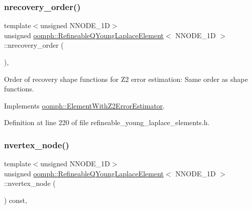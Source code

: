 \subsubsection{\texorpdfstring{nrecovery\+\_\+order()}{nrecovery\_order()}}
{\footnotesize\ttfamily template$<$unsigned N\+N\+O\+D\+E\+\_\+1D$>$ \\
unsigned \hyperlink{classoomph_1_1RefineableQYoungLaplaceElement}{oomph\+::\+Refineable\+Q\+Young\+Laplace\+Element}$<$ N\+N\+O\+D\+E\+\_\+1D $>$\+::nrecovery\+\_\+order (\begin{DoxyParamCaption}{ }\end{DoxyParamCaption})\hspace{0.3cm}{\ttfamily [inline]}, {\ttfamily [virtual]}}



Order of recovery shape functions for Z2 error estimation\+: Same order as shape functions. 



Implements \hyperlink{classoomph_1_1ElementWithZ2ErrorEstimator_af39480835bd3e0f6b2f4f7a9a4044798}{oomph\+::\+Element\+With\+Z2\+Error\+Estimator}.



Definition at line 220 of file refineable\+\_\+young\+\_\+laplace\+\_\+elements.\+h.

\mbox{\label{classoomph_1_1RefineableQYoungLaplaceElement_a529edc16e5232c8f1387f8858f8f20ad}} 
\subsubsection{\texorpdfstring{nvertex\+\_\+node()}{nvertex\_node()}}
{\footnotesize\ttfamily template$<$unsigned N\+N\+O\+D\+E\+\_\+1D$>$ \\
unsigned \hyperlink{classoomph_1_1RefineableQYoungLaplaceElement}{oomph\+::\+Refineable\+Q\+Young\+Laplace\+Element}$<$ N\+N\+O\+D\+E\+\_\+1D $>$\+::nvertex\+\_\+node (\begin{DoxyParamCaption}{ }\end{DoxyParamCaption}) const\hspace{0.3cm}{\ttfamily [inline]}, {\ttfamily [virtual]}}



